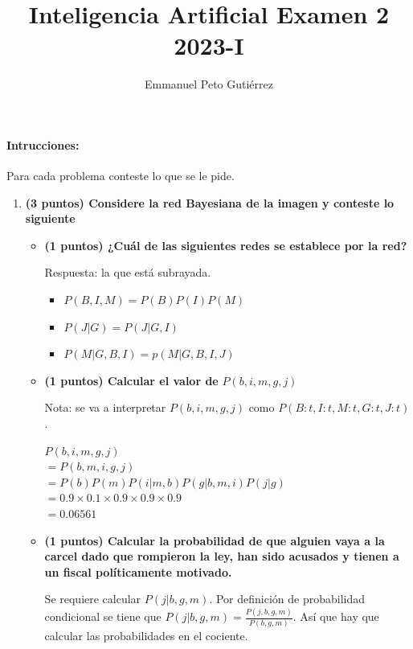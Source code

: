 \documentclass[a4paper,10pt]{article}
\author{Emmanuel Peto Gutiérrez}
\title{Inteligencia Artificial Examen 2\\2023-I}
\begin{document}
\maketitle

\paragraph{Intrucciones:} Para cada problema conteste lo que se le pide.

 \begin{enumerate}
 \item \textbf{(3 puntos) Considere la red Bayesiana de la imagen y conteste lo siguiente}
	\begin{itemize}
		\item \textbf{(1 puntos) ¿Cuál de las siguientes redes se establece por la red?}

Respuesta: la que está subrayada.

		\begin{itemize}
			\item $P(B,I,M)=P(B)P(I)P(M)$
			
			\item  \underline{$P(J| G)=P(J | G,I)$}
			
			\item $P(M| G,B,I)=p(M| G,B,I,J)$
			
		\end{itemize}

		\item \textbf{(1 puntos) Calcular el valor de} $P(b,i,m,g,j)$

Nota: se va a interpretar $P(b,i,m,g,j)$ como $P(B:t, I:t, M:t, G:t, J:t)$.

$P(b,i,m,g,j)$\\
$= P(b,m,i,g,j)$\\
$= P(b) P(m) P(i | m,b) P(g | b,m,i) P(j | g)$\\
$= 0.9 \times 0.1 \times 0.9 \times 0.9 \times 0.9$\\
\underline{$= 0.06561$}

		\item \textbf{(1 puntos) Calcular la probabilidad de que alguien vaya a la carcel dado que rompieron la ley, han sido acusados y tienen a un fiscal políticamente motivado.}


Se requiere calcular $P(j | b, g, m)$. Por definición de probabilidad condicional se tiene que $P(j | b, g, m) = \frac{P(j, b, g, m)}{P(b, g, m)}$. Así que hay que calcular las probabilidades en el cociente.


\end{itemize}
\end{enumerate}
\end{document}
